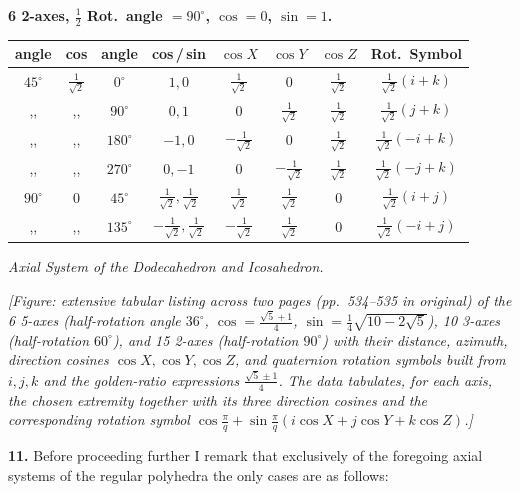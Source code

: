 \documentclass[11pt]{article}
\begin{document}
\medskip
\noindent\textbf{6 2-axes, $\tfrac{1}{2}$ Rot.~angle $= 90^\circ$, $\cos = 0$, $\sin = 1$.}
\begin{center}
\begin{tabular}{|c|c|c|c|c|c|c|c|}\hline
angle & cos & angle & cos\,/\,sin & $\cos X$ & $\cos Y$ & $\cos Z$ & Rot.~Symbol \\\hline
$45^\circ$ & $\tfrac{1}{\sqrt{2}}$ & $0^\circ$ & $1,0$ & $\tfrac{1}{\sqrt{2}}$ & $0$ & $\tfrac{1}{\sqrt{2}}$ & $\tfrac{1}{\sqrt{2}}(i + k)$ \\
,, & ,, & $90^\circ$ & $0,1$ & $0$ & $\tfrac{1}{\sqrt{2}}$ & $\tfrac{1}{\sqrt{2}}$ & $\tfrac{1}{\sqrt{2}}(j + k)$ \\
,, & ,, & $180^\circ$ & $-1,0$ & $-\tfrac{1}{\sqrt{2}}$ & $0$ & $\tfrac{1}{\sqrt{2}}$ & $\tfrac{1}{\sqrt{2}}(-i + k)$ \\
,, & ,, & $270^\circ$ & $0,-1$ & $0$ & $-\tfrac{1}{\sqrt{2}}$ & $\tfrac{1}{\sqrt{2}}$ & $\tfrac{1}{\sqrt{2}}(-j + k)$ \\
$90^\circ$ & $0$ & $45^\circ$ & $\tfrac{1}{\sqrt{2}},\tfrac{1}{\sqrt{2}}$ & $\tfrac{1}{\sqrt{2}}$ & $\tfrac{1}{\sqrt{2}}$ & $0$ & $\tfrac{1}{\sqrt{2}}(i + j)$ \\
,, & ,, & $135^\circ$ & $-\tfrac{1}{\sqrt{2}},\tfrac{1}{\sqrt{2}}$ & $-\tfrac{1}{\sqrt{2}}$ & $\tfrac{1}{\sqrt{2}}$ & $0$ & $\tfrac{1}{\sqrt{2}}(-i + j)$ \\\hline
\end{tabular}
\end{center}

\medskip
\begin{center}\emph{Axial System of the Dodecahedron and Icosahedron.}\end{center}
\medskip

\textit{[Figure: extensive tabular listing across two pages (pp.~534--535 in original) of the 6 5-axes (half-rotation angle $36^\circ$, $\cos = \tfrac{\sqrt{5}+1}{4}$, $\sin = \tfrac{1}{4}\sqrt{10 - 2\sqrt{5}}$), 10 3-axes (half-rotation $60^\circ$), and 15 2-axes (half-rotation $90^\circ$) with their distance, azimuth, direction cosines $\cos X, \cos Y, \cos Z$, and quaternion rotation symbols built from $i, j, k$ and the golden-ratio expressions $\tfrac{\sqrt{5}\pm 1}{4}$. The data tabulates, for each axis, the chosen extremity together with its three direction cosines and the corresponding rotation symbol $\cos\tfrac{\pi}{q} + \sin\tfrac{\pi}{q}(i\cos X + j\cos Y + k\cos Z)$.]}

\medskip

\textbf{11.} Before proceeding further I remark that exclusively of the foregoing axial systems of the regular polyhedra the only cases are as follows:
\end{document}
